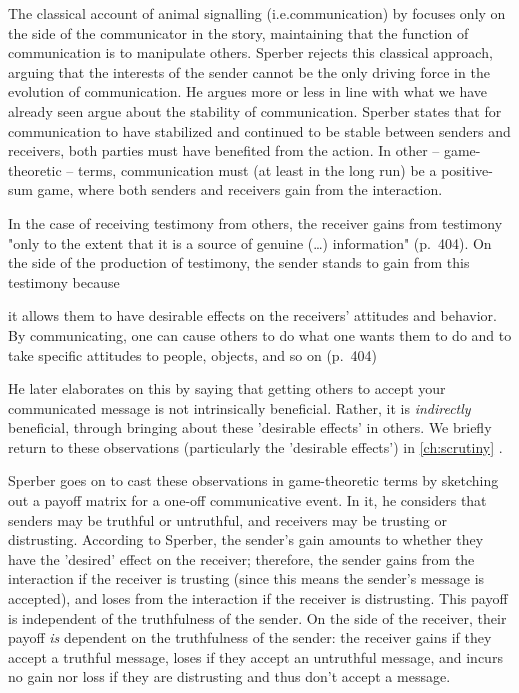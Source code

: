 The classical account of animal signalling (i.e.\@ communication) by \citet{DawkinsKrebs78} focuses only on the side of the communicator in the story, maintaining that the function of communication is to manipulate others. Sperber rejects this classical approach, arguing that the interests of the sender cannot be the only driving force in the evolution of communication.
He argues more or less in line with what we have already seen \citet{Scott-Phillips08} argue about the stability of communication.
Sperber states that for communication to have stabilized and continued to be stable between senders and receivers, both parties must have benefited from the action. In other -- game-theoretic -- terms, communication must (at least in the long run) be a positive-sum game, where both senders and receivers gain from the interaction.

In the case of receiving testimony from others, the receiver gains from testimony "only to the extent that it is a source of genuine (\ldots) information" (p.~404).
On the side of the production of testimony, the sender stands to gain from this testimony because
\begin{quoting}
    it allows them to have desirable effects on the receivers' attitudes and behavior. By communicating, one can cause others to do what one wants them to do and to take specific attitudes to people, objects, and so on
    \hfill (p.~404)
\end{quoting}
He later elaborates on this by saying that getting others to accept your communicated message is not intrinsically beneficial. Rather, it is \emph{indirectly} beneficial, through bringing about these 'desirable effects' in others.
We briefly return to these observations (particularly the 'desirable effects') in \cref{ch:scrutiny} .

Sperber goes on to cast these observations in game-theoretic terms by sketching out a payoff matrix for a one-off communicative event. In it, he considers that senders may be truthful or untruthful, and receivers may be trusting or distrusting. According to Sperber, the sender's gain amounts to whether they have the 'desired' effect on the receiver; therefore, the sender gains from the interaction if the receiver is trusting (since this means the sender's message is accepted), and loses from the interaction if the receiver is distrusting. This payoff is independent of the truthfulness of the sender. On the side of the receiver, their payoff \emph{is} dependent on the truthfulness of the sender: the receiver gains if they accept a truthful message, loses if they accept an untruthful message, and incurs no gain nor loss if they are distrusting and thus don't accept a message.

